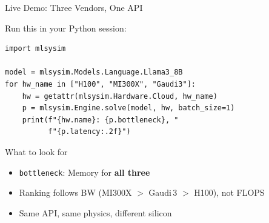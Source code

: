 \documentclass[aspectratio=169, 12pt]{beamer}
\begin{document}
\begin{frame}[fragile]{Live Demo: Three Vendors, One API}

\small
Run this in your Python session:

\begin{lstlisting}
import mlsysim

model = mlsysim.Models.Language.Llama3_8B
for hw_name in ["H100", "MI300X", "Gaudi3"]:
    hw = getattr(mlsysim.Hardware.Cloud, hw_name)
    p = mlsysim.Engine.solve(model, hw, batch_size=1)
    print(f"{hw.name}: {p.bottleneck}, "
          f"{p.latency:.2f}")
\end{lstlisting}

\vspace{0.2cm}
\begin{exampleblock}{What to look for}
  \begin{itemize}
    \item \texttt{bottleneck}: Memory for \textbf{all three}
    \item Ranking follows BW (MI300X $>$ Gaudi\,3 $>$ H100), not FLOPS
    \item Same API, same physics, different silicon
  \end{itemize}
\end{exampleblock}
\end{frame}
\end{document}
